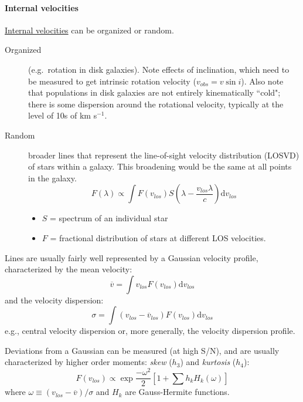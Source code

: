 \documentclass{article}
\newcommand{\mynotes}[1]{\textcolor{cadmiumgreen}{#1}}
\begin{document}
\paragraph{Internal velocities}
\href{http://astronomy.nmsu.edu/holtz/a555/resources/intvel.gif}
{Internal velocities} can be organized or random.
\begin{description}
    \item [Organized] (e.g.\ rotation in disk galaxies). Note effects of
        inclination, which need to be measured to get intrinsic rotation
        velocity ($v_{obs} = v\sin{i}$).
        Also note that populations in disk galaxies are not entirely
        kinematically ``cold"; there is some dispersion around the rotational
        velocity, typically at the level of 10s of km s$^{-1}$.
    \item [Random] broader lines that represent the line-of-sight
        velocity distribution (LOSVD) of stars within a galaxy.
        \mynotes{This broadening would be the same at all points in the galaxy.}
        \[
            F(\lambda) \propto \int{
                F (v_{los}) S \left( \lambda - \frac{v_{los}\lambda}{c} \right)
                \mathrm{d}v_{los}}
            \]
        \begin{itemize}
            \item $S$ = spectrum of an individual star
            \item $F$ = fractional distribution of stars at
                different LOS velocities.
        \end{itemize}
\end{description}

Lines are usually fairly well represented
by a Gaussian velocity profile, characterized by the mean velocity:
\[
    \overline{v} = \int{v_{los}F(v_{los})\mathrm{d}v_{los}}
    \]
and the velocity dispersion:
\[
    \sigma = \int{ \left(v_{los} - \overline{v}_{los} \right)
    F\left(v_{los}\right) \mathrm{d}v_{los}}
    \]
e.g., central velocity dispersion or, more generally, the velocity
dispersion profile.

Deviations from a Gaussian can be measured (at high S/N),
and are usually characterized
by higher order moments: \textit{skew} ($h_{3}$) and \textit{kurtosis}
($h_{4}$):
\[
    F\left(v_{los}\right) \propto \exp\frac{-\omega^{2}}{2}\left[
        1 + \sum{h_{k}H_{k}(\omega)}\right]
    \]
where $\omega \equiv (v_{los}-\overline{v})/\sigma$ and
$H_{k}$ are Gauss-Hermite functions.
\end{document}
